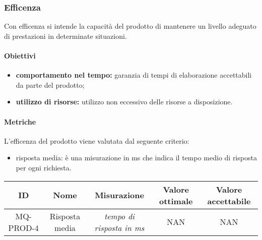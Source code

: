 \subsubsection{Efficenza}
Con efficenza si intende la capacità del prodotto di mantenere un livello adeguato di prestazioni in determinate situazioni.
	\paragraph{Obiettivi}
		\begin{itemize}
			\item \textbf{comportamento nel tempo:} garanzia di tempi di elaborazione accettabili da parte del prodotto;
			\item \textbf{utilizzo di risorse:} utilizzo non eccessivo delle risorse a disposizione.
		\end{itemize}
	\paragraph{Metriche}
	L'efficenza del prodotto viene valutata dal seguente criterio:
	\begin{itemize}
		\item risposta media: è una misurazione in ms che indica il tempo medio di risposta per ogni richiesta.
	\end{itemize}
	\begin{center}
		\begin{tabular}{|c|c|c|c|c|}
			\hline
			ID & Nome & Misurazione & Valore ottimale & Valore accettabile \\
			\hline
			MQ-PROD-4 & Risposta media & \textit{tempo di risposta in ms} & NAN & NAN \\
			\hline
		\end{tabular}
	\end{center}
